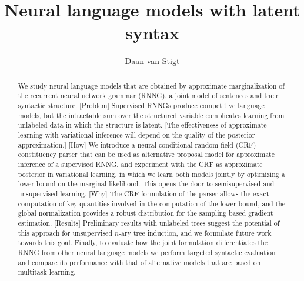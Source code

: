 \documentclass{uvamath}
\title{Neural language models with latent syntax}
\author{Daan van Stigt}
\theoremstyle{remark}
\theoremstyle{definition}
\theoremstyle{definition}
\theoremstyle{definition}
\theoremstyle{definition}
\theoremstyle{definition}
\begin{document}
\maketitle


\begin{abstract}
  We study neural language models that are obtained by approximate marginalization of the recurrent neural network grammar (RNNG), a joint model of sentences and their syntactic structure. [Problem] Supervised RNNGs produce competitive language models, but the intractable sum over the structured variable complicates learning from unlabeled data in which the structure is latent. [The effectiveness of approximate learning with variational inference will depend on the quality of the posterior approximation.] [How] We introduce a neural conditional random field (CRF) constituency parser that can be used as alternative proposal model for approximate inference of a supervised RNNG, and experiment with the CRF as approximate posterior in variational learning, in which we learn both models jointly by optimizing a lower bound on the marginal likelihood. This opens the door to semisupervised and unsupervised learning. [Why] The CRF formulation of the parser allows the exact computation of key quantities involved in the computation of the lower bound, and the global normalization provides a robust distribution for the sampling based gradient estimation. [Results] Preliminary results with unlabeled trees suggest the potential of this approach for unsupervised $n$-ary tree induction, and we formulate future work towards this goal. Finally, to evaluate how the joint formulation differentiates the RNNG from other neural language models we perform targeted syntactic evaluation and compare its performance with that of alternative models that are based on multitask learning.


\end{abstract}
\end{document}
